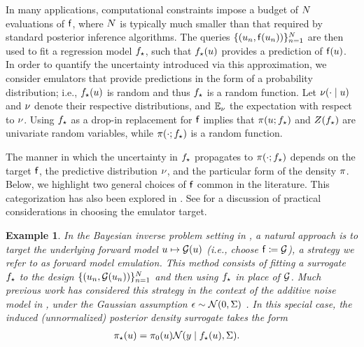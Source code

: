 \documentclass[12pt]{article}
\newtheorem{ex}{Example}
\begin{document}
In many applications, computational constraints impose a budget of 
$N$ evaluations of $\mathsf{f}$, where 
$N$ is typically much smaller than that required by standard posterior
inference algorithms. The queries $\{(u_n, \mathsf{f}(u_n))\}_{n=1}^{N}$
are then used to fit a regression model ${f}_{\star}$,
such that ${f}_{\star}(u)$ provides a prediction of $\mathsf{f}(u)$.
In order to quantify the uncertainty introduced via this approximation, we consider 
emulators that provide predictions in the form of a probability distribution; 
i.e., ${f}_{\star}(u)$ is random and thus ${f}_{\star}$ is a random function. 
Let $\nu(\cdot \mid u)$ and $\nu$ denote their respective distributions,
and $\mathbb{E}_{\nu}$ the expectation with respect to $\nu$.
Using ${f}_{\star}$ as a drop-in replacement for 
$\mathsf{f}$ implies that $\pi(u; {f}_{\star})$ and $Z({f}_{\star})$
are univariate random variables, while $\pi(\cdot; {f}_{\star})$ 
is a random function.

The manner in which the uncertainty in ${f}_{\star}$ propagates to 
$\pi(\cdot; {f}_{\star})$ depends on the target $\mathsf{f}$,
the predictive distribution $\nu$, and the particular form of the 
density $\pi$. Below, we highlight two general choices 
of $\mathsf{f}$ common in the literature. This categorization has also 
been explored in \citet{StuartTeck1,StuartTeck2,GP_PDE_priors}. See
\citet{reviewPaper} for a discussion of practical considerations in choosing 
the emulator target. 

\begin{ex} \label{ex:fwd-em}
In the Bayesian inverse problem setting in ,
a natural approach is to target the underlying forward model 
$u \mapsto \mathcal{G}(u)$ (i.e., choose $\mathsf{f} \coloneqq \mathcal{G}$), a strategy 
we refer to as \textit{forward model emulation}.
This method consists of fitting a surrogate ${f}_{\star}$ to the design 
$\{(u_n, \mathcal{G}(u_n))\}_{n=1}^{N}$ and then using ${f}_{\star}$
in place of $\mathcal{G}$. Much previous work has considered this strategy 
in the context of the additive noise model in ,
under the Gaussian assumption $\epsilon \sim \mathcal{N}(0, \Sigma)$
\citep{StuartTeck1,GP_PDE_priors,hydrologicalModel,hydrologicalModel2,
Surer2023sequential,VillaniAdaptiveGP,weightedIVAR,idealizedGCM,CES}.
In this special case, the induced (unnormalized) posterior density surrogate takes the form
\begin{align}
{\pi}_{\star}(u) &= \pi_0(u) \mathcal{N}(y \mid {f}_{\star}(u), \Sigma). \label{eq:post-em-fwd-Gaussian}
\end{align}
\end{ex}
\end{document}
